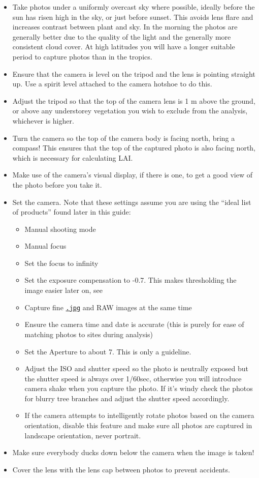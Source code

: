 \documentclass[11pt,a4paper]{article}
\newcommand\file[1]{\texttt{\underline{#1}}}
\begin{document}
\begin{itemize}
	\item{Take photos under a uniformly overcast sky where possible, ideally before the sun has risen high in the sky, or just before sunset. This avoids lens flare and increases contrast between plant and sky. In the morning the photos are generally better due to the quality of the light and the generally more consistent cloud cover. At high latitudes you will have a longer suitable period to capture photos than in the tropics.}
	\item{Ensure that the camera is level on the tripod and the lens is pointing straight up. Use a spirit level attached to the camera hotshoe to do this.}
	\item{Adjust the tripod so that the top of the camera lens is 1 m above the ground, or above any understorey vegetation you wish to exclude from the analysis, whichever is higher.} 
	\item{Turn the camera so the top of the camera body is facing north, bring a compass! This ensures that the top of the captured photo is also facing north, which is necessary for calculating LAI.}
	\item{Make use of the camera's visual display, if there is one, to get a good view of the photo before you take it.}
	\item{Set the camera. Note that these settings assume you are using the
		``ideal list of products'' found later in this guide:}
		\begin{itemize}
			\item{Manual shooting mode}
			\item{Manual focus}
			\item{Set the focus to infinity}
			\item{Set the exposure compensation to -0.7. This makes thresholding the image easier later on, see \citet{Zhang2005}}
			\item{Capture fine \file{.jpg} and RAW images at the same time}
			\item{Ensure the camera time and date is accurate (this is purely for ease of matching photos to sites during analysis)}
			\item{Set the Aperture to about 7. This is only a guideline.}
			\item{Adjust the ISO and shutter speed so the photo is neutrally exposed but the shutter speed is always over 1/60sec, otherwise you will introduce camera shake when you capture the photo. If it's windy check the photos for blurry tree branches and adjust the shutter speed accordingly.}
			\item{If the camera attempts to intelligently rotate photos based on the camera orientation, disable this feature and make sure all photos are captured in landscape orientation, never portrait.}
		\end{itemize}
	\item{Make sure everybody ducks down below the camera when the image is taken!}
	\item{Cover the lens with the lens cap between photos to prevent accidents.}
\end{itemize}
\end{document}
